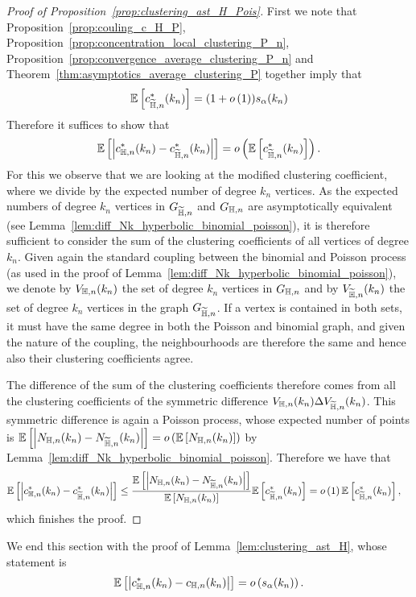 \begin{proof}[Proof of Proposition~\ref{prop:clustering_ast_H_Pois}]
First we note that Proposition~\ref{prop:couling_c_H_P}, Proposition~\ref{prop:concentration_local_clustering_P_n}, Proposition~\ref{prop:convergence_average_clustering_P_n} and Theorem~\ref{thm:asymptotics_average_clustering_P} together imply that
\[
	\mathbb{E}\left[c_{\widetilde{\mathbb{H}},n}^\ast(k_n)\right] = (1+o\left(1\right))s_\alpha(k_n)
\]
Therefore it suffices to show that
\[
	\mathbb{E}\left[\left|c_{\mathbb{H},n}^\ast(k_n) - c_{\widetilde{\mathbb{H}},n}^\ast(k_n)\right|\right] = o\left(\mathbb{E}\left[c_{\widetilde{\mathbb{H}},n}^\ast(k_n)\right]\right).
\]
For this we observe that we are looking at the modified clustering coefficient, where we divide by the expected number of degree $k_n$ vertices. As the expected numbers of degree $k_n$ vertices in $G_{\widetilde{\mathbb{H}},n}$ and $G_{\mathbb{H},n}$ are asymptotically equivalent (see Lemma~\ref{lem:diff_Nk_hyperbolic_binomial_poisson}), it is therefore sufficient to consider the sum of the clustering coefficients of all vertices of degree $k_n$.
Given again the standard coupling between the binomial and Poisson process (as used in the proof of Lemma~\ref{lem:diff_Nk_hyperbolic_binomial_poisson}), we denote by $V_{\mathbb{H},n}(k_n)$ the set of degree $k_n$ vertices in $G_{\mathbb{H},n}$ and by $V_{\widetilde{\mathbb{H}},n}(k_n)$ the set of degree $k_n$ vertices in the graph $G_{\widetilde{\mathbb{H}},n}$. If a vertex is contained in both sets, it must have the same degree in both the Poisson and binomial graph, and given the nature of the coupling, the neighbourhoods are therefore the same and hence also their clustering coefficients agree.

The difference of the sum of the clustering coefficients therefore comes from all the clustering coefficients of the symmetric difference $V_{\mathbb{H},n}(k_n) \Delta V_{\widetilde{\mathbb{H}},n}(k_n)$. This symmetric difference is again a Poisson process, whose expected number of points is $\mathbb{E}\left[\left|N_{\mathbb{H},n}(k_n) - N_{\widetilde{\mathbb{H}},n}(k_n)\right|\right] = o\left(\mathbb{E}\left[N_{\mathbb{H},n}(k_n)\right]\right)$ by Lemma~\ref{lem:diff_Nk_hyperbolic_binomial_poisson}. Therefore we have that
\begin{align*}
	\mathbb{E}\left[\left|c_{\mathbb{H},n}^\ast(k_n) - c_{\widetilde{\mathbb{H}},n}^\ast(k_n)\right|\right]
	&\le \frac{\mathbb{E}\left[\left|N_{\mathbb{H},n}(k_n)-N_{\widetilde{\mathbb{H}},n}(k_n)\right|\right]}{\mathbb{E}\left[N_{\mathbb{H},n}(k_n)\right]} \mathbb{E}\left[c_{\widetilde{\mathbb{H}},n}^\ast(k_n)\right]
	= o\left(1\right)\mathbb{E}\left[c_{\widetilde{\mathbb{H}},n}^\ast(k_n)\right],
\end{align*}
which finishes the proof.
\end{proof}

We end this section with the proof of Lemma~\ref{lem:clustering_ast_H}, whose statement is
\[
	\mathbb{E}\left[\left|c_{\mathbb{H}, n}^\ast(k_n) - c_{\mathbb{H}, n}(k_n)\right|\right] = o\left(s_\alpha(k_n)\right).
\]

